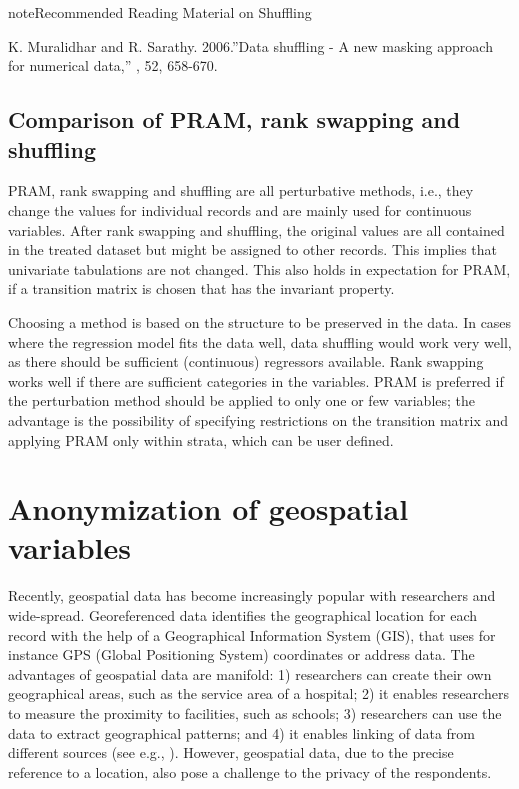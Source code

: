 \documentclass[letterpaper,10pt,english]{sphinxmanual}
\begin{document}
\begin{sphinxadmonition}{note}{Recommended Reading Material on Shuffling}

K. Muralidhar and R. Sarathy. 2006.”Data shuffling - A new masking
approach for numerical data,” , 52, 658-670.
\end{sphinxadmonition}


\subsection{Comparison of PRAM, rank swapping and shuffling}
\label{\detokenize{anon_methods:comparison-of-pram-rank-swapping-and-shuffling}}
PRAM, rank swapping and shuffling are all perturbative methods, i.e.,
they change the values for individual records and are mainly used for
continuous variables. After rank swapping and shuffling, the original
values are all contained in the treated dataset but might be assigned to
other records. This implies that univariate tabulations are not changed.
This also holds in expectation for PRAM, if a transition matrix is
chosen that has the invariant property.

Choosing a method is based on the structure to be preserved in the data.
In cases where the regression model fits the data well, data shuffling
would work very well, as there should be sufficient (continuous)
regressors available. Rank swapping works well if there are sufficient
categories in the variables. PRAM is preferred if the perturbation
method should be applied to only one or few variables; the advantage is
the possibility of specifying restrictions on the transition matrix and
applying PRAM only within strata, which can be user defined.


\section{Anonymization of geospatial variables}
\label{\detokenize{anon_methods:anonymization-of-geospatial-variables}}
Recently, geospatial data has become increasingly popular with
researchers and wide-spread. Georeferenced data identifies the
geographical location for each record with the help of a Geographical
Information System (GIS), that uses for instance GPS (Global Positioning
System) coordinates or address data. The advantages of geospatial data
are manifold: 1) researchers can create their own geographical areas,
such as the service area of a hospital; 2) it enables researchers to
measure the proximity to facilities, such as schools; 3) researchers can
use the data to extract geographical patterns; and 4) it enables linking
of data from different sources (see e.g., {\hyperref[\detokenize{anon_methods:bcrz13}]{}}).
However, geospatial data, due to the precise reference to a location,
also pose a challenge to the privacy of the respondents.
\end{document}
